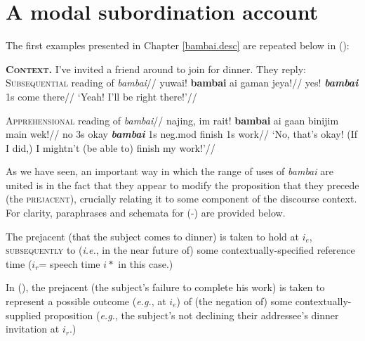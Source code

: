 \section{A modal subordination account}\label{bambai.subord}


The first examples presented in Chapter \ref{bambai.desc} are repeated below in (\nextx):

\pex{}\textbf{\textsc{Context}.} \textup{I've invited a friend around to join for dinner. They reply:}
\a{}\begingl\glpreamble\textsc{Subsequential} reading of \textit{bambai}//
\gla yuwai! \textbf{bambai} ai gaman jeya!//
\glb yes! \textbf{\textit{bambai}} 1s come there//
\glft ‘Yeah! I’ll be right there!’//\endgl

\a\begingl\glpreamble {}\textsc{Apprehensional} reading of \textit{bambai}//
\gla najing, im rait! \textbf{bambai} ai gaan binijim main wek!//
\glb no 3s okay \textbf{\textit{bambai}} 1s {\sc neg.mod} finish 1s work//
\glft ‘No, that’s okay! (If I did,) I mightn’t (be able to) finish my work!'\trailingcitation{[GT~20170316]}//\endgl
\xe

As we have seen, an important way in which the range of uses of \textit{bambai} are united is in the fact that they appear to modify the proposition that they precede (the \textsc{prejacent}), crucially relating it to some component of the discourse context. For clarity, paraphrases and schemata for (-) are provided below. 



\pex[exno=\getref{minpair}]
\a[label=a′]  The prejacent (that the subject comes to dinner) is taken to hold at $ i_e $, \textsc{subsequently} to (\textit{i.e.}, in the near future of) some contextually-specified reference time ($ i_r $= speech time $ i* $ in this case.)

{\centering
{}
}

\a[label=b′] In (), the prejacent (the subject's failure to complete his work) is taken to represent a possible outcome (\textit{e.g.}, at $ i_e $) of (the negation of) some contextually-supplied proposition (\textit{e.g.}, the subject's not declining their addressee's dinner invitation at $ i_r $.)

